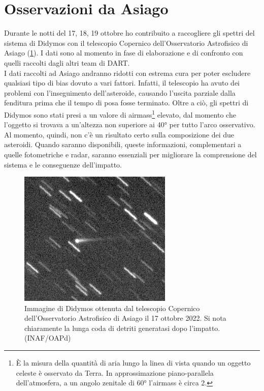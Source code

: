 \section{Osservazioni da Asiago}
Durante le notti del 17, 18, 19 ottobre ho contribuito a raccogliere gli spettri del sistema di Didymos con il telescopio Copernico dell'Osservatorio Astrofisico di Asiago (\cref{fig:didymos_asiago}). I dati sono al momento in fase di elaborazione e di confronto con quelli raccolti dagli altri team di DART.\\
I dati raccolti ad Asiago andranno ridotti con estrema cura per poter escludere qualsiasi tipo di bias dovuto a vari fattori. Infatti, il telescopio ha avuto dei problemi con l'inseguimento dell'asteroide, causando l'uscita parziale dalla fenditura prima che il tempo di posa fosse terminato. Oltre a ciò, gli spettri di Didymos sono stati presi a un valore di airmass\footnote{È la misura della quantità di aria lungo la linea di vista quando un oggetto celeste è osservato da Terra. In approssimazione piano-parallela dell'atmosfera, a un angolo zenitale di 60° l'airmass è circa 2.} elevato, dal momento che l'oggetto si trovava a un'altezza non superiore ai 40° per tutto l'arco osservativo.\\
Al momento, quindi, non c'è un risultato certo sulla composizione dei due asteroidi. Quando saranno disponibili, queste informazioni, complementari a quelle fotometriche e radar, saranno essenziali per migliorare la comprensione del sistema e le conseguenze dell'impatto.

\begin{figure}
    \centering
    \includegraphics[scale=1]{figure/didymos_asiago.jpg}
    \caption[Immagine di Didymos ottenuta con il telescopio Copernico dell'OAPd.]{Immagine di Didymos ottenuta dal telescopio Copernico dell'Osservatorio Astrofisico di Asiago il 17 ottobre 2022. Si nota chiaramente la lunga coda di detriti generatasi dopo l'impatto. (INAF/OAPd)}
    \label{fig:didymos_asiago}
\end{figure}

